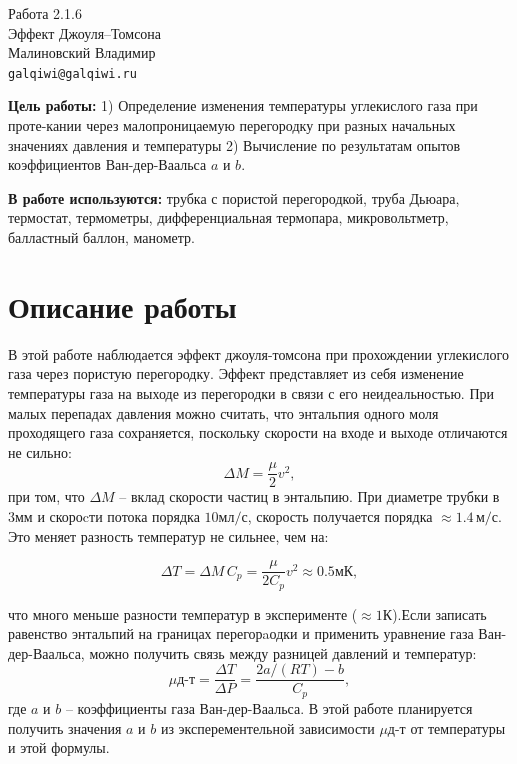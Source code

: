 
\usepackage{booktabs}



\begin{center}
  \LARGE{Работа 2.1.6}\\[0.2cm]
  \LARGE{Эффект Джоуля–Томсона}\\[0.2cm]
  \large{Малиновский Владимир}\\[0.2cm]
  \normalsize{\texttt{galqiwi@galqiwi.ru}}
\end{center}

\textbf{Цель работы:} 1) Определение изменения температуры углекислого газа при проте-кании через малопроницаемую перегородку при разных начальных значениях давления и температуры 2) Вычисление по результатам опытов коэффициентов Ван-дер-Ваальса $a$ и $b$.

\textbf{В работе используются:} трубка с пористой перегородкой, труба Дьюара, термостат, термометры, дифференциальная термопара, микровольтметр, балластный баллон, манометр.

\section*{Описание работы}

В этой работе наблюдается эффект джоуля-томсона при прохождении углекислого газа через пористую перегородку. Эффект представляет из себя изменение температуры газа на выходе из перегородки в связи с его неидеальностью. При малых перепадах давления можно считать, что энтальпия одного моля проходящего газа сохраняется, поскольку скорости на входе и выходе отличаются не сильно:
$$\Delta M=\frac{\mu}{2} v^2,$$
при том, что $\Delta M$ -- вклад скорости частиц в энтальпию. При диаметре трубки в $3\text{мм}$ и скороcти потока порядка $10\text{мл}/\text{с}$, скорость получается порядка $\approx 1.4\,\text{м}/\text{с}$. Это меняет разность температур не сильнее, чем на:

$$\Delta T=\Delta M\,C_p=\frac{\mu}{2C_p}v^2\approx0.5\text{мК},$$

что много меньше разности температур в эксперименте ($\approx1\text{К}$).Если записать равенство энтальпий на границах перегорaодки и применить уравнение газа Ван-дер-Ваальса, можно получить связь между разницей давлений и температур:
$$\mu\text{д-т} = \frac{\Delta T}{\Delta P} = \frac{2a/(RT) - b}{C_p},$$
где $a$ и $b$ -- коэффициенты газа Ван-дер-Ваальса. В этой работе планируется получить значения $a$ и $b$ из эксперементельной зависимости $\mu\text{д-т}$ от температуры и этой формулы.

